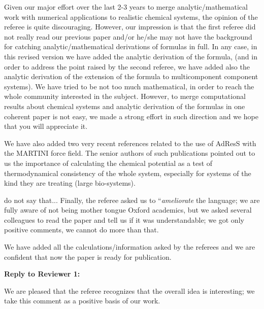 \documentclass[12pt]{article}
\newcommand{\recheck}[1]{{\color{red} #1}}
\begin{document}
Given our major effort over the last 2-3 years to merge analytic/mathematical work with numerical applications to realistic chemical systems, the opinion of the referee is quite discouraging. 
However, our impression is that the first referee did not really read our previous paper and/or he/she may not have the background for catching analytic/mathematical derivations of formulas in full. In any case, in this revised version we have added the analytic derivation of the formula, (and in order to address the point raised by the second referee, we have added also the analytic derivation of the extension of the formula to multicomponent component systems). We have tried to be not too much mathematical, in order to reach the whole community interested in the subject. However, to merge computational results about chemical systems and analytic derivation of the formulas in one coherent paper is not easy, we made a strong effort in such direction and we hope that you will appreciate it.

We have also added two very recent references related to the use of AdResS with the MARTINI force field. The senior authors of such publications pointed out to us the importance of calculating the chemical potential as a test of thermodynamical consistency of the whole system, especially for systems of the kind they are treating (large bio-systems).

\recheck{do not say that...}
Finally, the referee asked us to ``{\it ameliorate} the language; we are fully aware of not being mother tongue Oxford academics, but we asked several colleagues to read the paper and tell us if it was understandable; we got only positive comments, we cannot do more than that.

We have added all the calculations/information asked by the referees and we are confident that now the paper is ready for publication.


\newpage

{\bf Reply to Reviewer 1:}

{\color{blue}{\it ``..... The idea of calculating excess
    chemical potentials from adaptive resolution techniques is appealing}}

We are pleased that the referee recognizes that the overall idea is interesting; we take this comment as a positive basis of our work.

{\color{blue}{\it ``This work is in fact a sort of extension of Ref. 5, and its contribution is just to offer a check of the
statements, hypothesis and calculations made on that previous paper. It is not easy to judge the relevance of this
work because it might contain enough simulations, but not new information. In fact, its main contribution is a table, with comparison with reported data.}}
\end{document}

